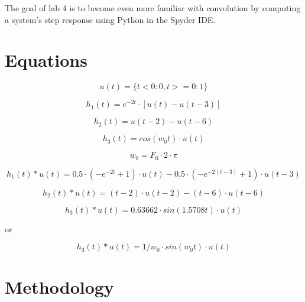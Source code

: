 \documentclass[12pt]{report}
\begin{document}
The goal of lab 4 is to become even more familiar with convolution by computing a system's step response using Python in the Spyder IDE.

\section{Equations}
    \begin{equation*}
        u(t) = \{t<0:0, t>=0:1\}
    \end{equation*}
 
    \begin{equation*}
        h_1(t) = e^{-2t} \cdot [u(t) - u(t-3)]
    \end{equation*}
    
    \begin{equation*}
        h_2(t) = u(t − 2) − u(t − 6)
    \end{equation*}
    
    \begin{equation*}
        h_3(t) = cos( w_0t ) \cdot u(t)
    \end{equation*}
    
    \begin{equation*}
        w_0 = F_0 \cdot 2 \cdot \pi
    \end{equation*}

    \begin{equation*}
        h_1(t) * u(t) = 0.5 \cdot (-e^{-2t} + 1) \cdot u(t) - 0.5 \cdot (-e^{-2(t-3)}+1) \cdot u(t-3)
    \end{equation*}
    
    \begin{equation*}
        h_2(t) * u(t) = (t-2) \cdot u(t-2) - (t-6) \cdot u(t-6)
    \end{equation*}
    
    \begin{equation*}
        h_3(t) * u(t) = 0.63662 \cdot sin(1.5708t) \cdot u(t)
    \end{equation*}
    
    \begin{center} or \end{center}
    \begin{equation*}
        h_3(t) * u(t) = 1/w_0 \cdot sin(w_0t) \cdot u(t)
    \end{equation*}
    
\section{Methodology}
\end{document}
